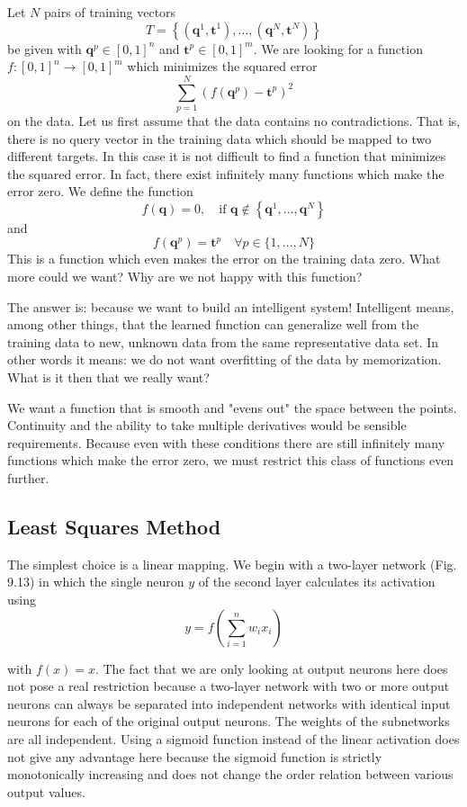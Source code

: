 \documentclass[10pt]{book}
\begin{document}
Let $N$ pairs of training vectors
\[
T=\left\{\left(\boldsymbol{q}^{1}, \boldsymbol{t}^{1}\right), \ldots,\left(\boldsymbol{q}^{N}, \boldsymbol{t}^{N}\right)\right\}
\]
be given with $\boldsymbol{q}^{p} \in [0,1]^{n}$ and $\boldsymbol{t}^{p} \in [0,1]^{m}$. We are looking for a function $f:[0,1]^{n} \rightarrow [0,1]^{m}$ which minimizes the squared error
\[
\sum_{p=1}^{N}\left(f\left(\boldsymbol{q}^{p}\right)-\boldsymbol{t}^{p}\right)^{2}
\]
on the data. Let us first assume that the data contains no contradictions. That is, there is no query vector in the training data which should be mapped to two different targets. In this case it is not difficult to find a function that minimizes the squared error. In fact, there exist infinitely many functions which make the error zero. We define the function
\[
f(\boldsymbol{q})=0, \quad \text{if } \boldsymbol{q} \notin \left\{\boldsymbol{q}^{1}, \ldots, \boldsymbol{q}^{N}\right\}
\]
and
\[
f\left(\boldsymbol{q}^{p}\right)=\boldsymbol{t}^{p} \quad \forall p \in\{1, \ldots, N\}
\]
This is a function which even makes the error on the training data zero. What more could we want? Why are we not happy with this function?

The answer is: because we want to build an intelligent system! Intelligent means, among other things, that the learned function can generalize well from the training data to new, unknown data from the same representative data set. In other words it means: we do not want overfitting of the data by memorization. What is it then that we really want?

We want a function that is smooth and "evens out" the space between the points. Continuity and the ability to take multiple derivatives would be sensible requirements. Because even with these conditions there are still infinitely many functions which make the error zero, we must restrict this class of functions even further.

\subsection{Least Squares Method}
The simplest choice is a linear mapping. We begin with a two-layer network (Fig. 9.13) in which the single neuron $y$ of the second layer calculates its activation using
$$
y=f\left(\sum_{i=1}^{n} w_{i} x_{i}\right)
$$

with $f(x)=x$. The fact that we are only looking at output neurons here does not pose a real restriction because a two-layer network with two or more output neurons can always be separated into independent networks with identical input neurons for each of the original output neurons. The weights of the subnetworks are all independent. Using a sigmoid function instead of the linear activation does not give any advantage here because the sigmoid function is strictly monotonically increasing and does not change the order relation between various output values.
\end{document}

